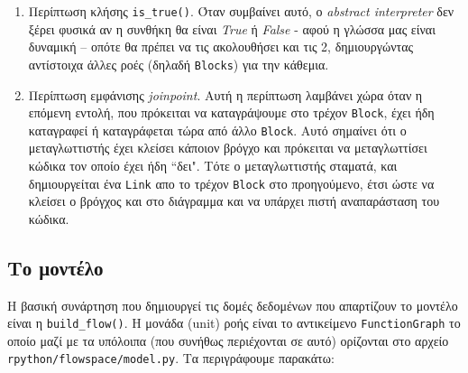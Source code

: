 \begin{enumerate}

\item Περίπτωση κλήσης \texttt{is\_true()}. Όταν συμβαίνει αυτό, ο \textit{
abstract interpreter} δεν ξέρει φυσικά αν η συνθήκη θα είναι \textit{True} ή
\textit{False} - αφού η γλώσσα μας είναι δυναμική – οπότε θα πρέπει να τις 
ακολουθήσει και τις 2, δημιουργώντας αντίστοιχα άλλες ροές (δηλαδή
\texttt{Blocks}) για την κάθεμια.

\item Περίπτωση εμφάνισης \textit{joinpoint}. Αυτή η περίπτωση λαμβάνει χώρα
όταν η επόμενη εντολή, που πρόκειται να καταγράψουμε στο τρέχον \texttt{Block},
έχει ήδη καταγραφεί ή καταγράφεται τώρα από άλλο \texttt{Block}. Αυτό σημαίνει
ότι ο μεταγλωττιστής έχει κλείσει κάποιον βρόγχο και πρόκειται να μεταγλωττίσει
κώδικα τον οποίο έχει ήδη ``δει". Τότε ο μεταγλωττιστής σταματά, και
δημιουργείται ένα \texttt{Link} απο το τρέχον \texttt{Block} στο προηγούμενο,
έτσι ώστε να κλείσει ο βρόγχος και στο διάγραμμα και να υπάρχει πιστή
αναπαράσταση του κώδικα.

\end{enumerate}

\subsection{Το μοντέλο}

Η βασική συνάρτηση που δημιουργεί τις δομές δεδομένων που απαρτίζουν το μοντέλο
είναι η \texttt{build\_flow()}. Η μονάδα (unit) ροής είναι το αντικείμενο
\texttt{FunctionGraph} το οποίο μαζί με τα υπόλοιπα (που συνήθως περιέχονται σε
αυτό) ορίζονται στο αρχείο \texttt{rpython/flowspace/model.py}. Τα περιγράφουμε
παρακάτω:

